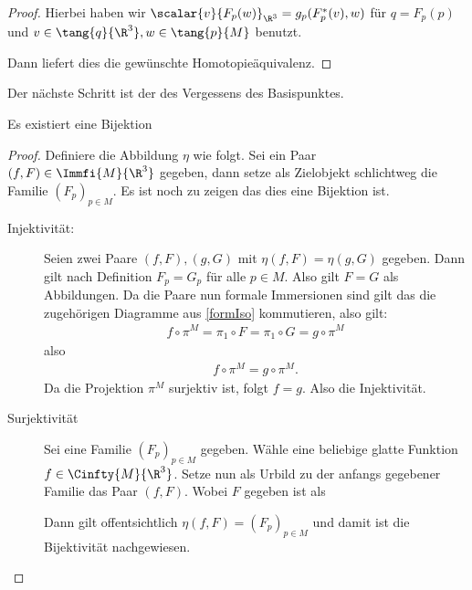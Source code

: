 \begin{Satz}
\begin{proof}
		Hierbei haben wir $ \scalar{v}{F_p(w)}_{\R^3} = g_p(F_p^\ast(v),w) $ für $ q =F_p(p) $ und $ v \in \tang{q}{\R^3},w\in \tang{p}{M} $ 
		benutzt.
		
		Dann liefert dies die gewünschte Homotopieäquivalenz.
	
	\end{proof}
\end{Satz}

Der nächste Schritt ist der des Vergessens des Basispunktes.

\begin{Lem}
  Es existiert eine Bijektion
	
  \begin{proof}
    Definiere die Abbildung $ \eta $ wie folgt. Sei ein Paar
    $ (f,F) \in \Immfi{M}{\R^3}$ gegeben, dann setze als Zielobjekt
    schlichtweg die Familie $ (F_p)_{p\in M} $. Es ist noch zu zeigen
    das dies eine Bijektion ist.
    \begin{description}
    \item[Injektivität:] Seien zwei Paare $ (f,F),(g,G) $ mit
      $ \eta(f,F)=\eta(g,G) $ gegeben. Dann gilt nach Definition
      $ F_p = G_p $ für alle $ p\in M $. Also gilt $ F=G $ als
      Abbildungen. Da die Paare nun formale Immersionen sind gilt das
      die zugehörigen Diagramme aus \cref{formIso} kommutieren, also
      gilt:
      \begin{gather*}
        f \circ \pi^M = \pi_1 \circ F = \pi_1 \circ G = g \circ \pi^M
      \end{gather*}
      also
      \begin{gather*}
        f \circ \pi^M = g \circ \pi^M.
      \end{gather*}  Da die Projektion $ \pi^M $ surjektiv ist, folgt
      $ f=g $.  Also die Injektivität.
    \item[Surjektivität] Sei eine Familie $ (F_p)_{p\in M} $
      gegeben. Wähle eine beliebige glatte Funktion
      $ f\in \Cinfty{M}{\R^3} $. Setze nun als Urbild zu der anfangs
      gegebener Familie das Paar $ (f,F) $. Wobei $ F $ gegeben ist als
			 
      Dann gilt offentsichtlich $ \eta(f,F)=(F_p)_{p\in M} $ und damit
      ist die Bijektivität nachgewiesen.
    \end{description}
  \end{proof}
\end{Lem}

